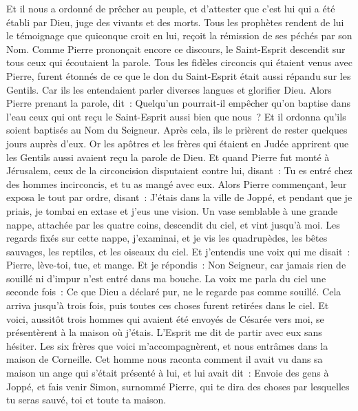 \begin{multicols}{2}
Et il nous a ordonné de prêcher au peuple, et d'attester que c'est lui qui a été établi par Dieu, juge des vivants et des morts.
Tous les prophètes rendent de lui le témoignage que quiconque croit en lui, reçoit la rémission de ses péchés par son Nom.
Comme Pierre prononçait encore ce discours, le Saint-Esprit descendit sur tous ceux qui écoutaient la parole.
Tous les fidèles circoncis qui étaient venus avec Pierre, furent étonnés de ce que le don du Saint-Esprit était aussi répandu sur les Gentils.
Car ils les entendaient parler diverses langues et glorifier Dieu.
Alors Pierre prenant la parole, dit~: Quelqu'un pourrait-il empêcher qu'on baptise dans l'eau ceux qui ont reçu le Saint-Esprit aussi bien que nous~?
Et il ordonna qu'ils soient baptisés au Nom du Seigneur. Après cela, ils le prièrent de rester quelques jours auprès d'eux.
\VerseOne{}Or les apôtres et les frères qui étaient en Judée apprirent que les Gentils aussi avaient reçu la parole de Dieu.
Et quand Pierre fut monté à Jérusalem, ceux de la circoncision disputaient contre lui,
disant~: Tu es entré chez des hommes incirconcis, et tu as mangé avec eux.
Alors Pierre commençant, leur exposa le tout par ordre, disant~:
J'étais dans la ville de Joppé, et pendant que je priais, je tombai en extase et j'eus une vision. Un vase semblable à une grande nappe, attachée par les quatre coins, descendit du ciel, et vint jusqu'à moi.
Les regards fixés sur cette nappe, j'examinai, et je vis les quadrupèdes, les bêtes sauvages, les reptiles, et les oiseaux du ciel.
Et j'entendis une voix qui me disait~: Pierre, lève-toi, tue, et mange.
Et je répondis~: Non Seigneur, car jamais rien de souillé ni d'impur n'est entré dans ma bouche.
La voix me parla du ciel une seconde fois~: Ce que Dieu a déclaré pur, ne le regarde pas comme souillé.
Cela arriva jusqu'à trois fois, puis toutes ces choses furent retirées dans le ciel.
Et voici, aussitôt trois hommes qui avaient été envoyés de Césarée vers moi, se présentèrent à la maison où j'étais.
L'Esprit me dit de partir avec eux sans hésiter. Les six frères que voici m'accompagnèrent, et nous entrâmes dans la maison de Corneille.
Cet homme nous raconta comment il avait vu dans sa maison un ange qui s'était présenté à lui, et lui avait dit~: Envoie des gens à Joppé, et fais venir Simon, surnommé Pierre,
qui te dira des choses par lesquelles tu seras sauvé, toi et toute ta maison.

\end{multicols}
